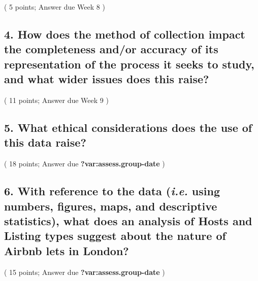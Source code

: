 \documentclass[
  a4paper,
  DIV=11,
  numbers=noendperiod]{scrartcl}
\begin{document}
( 5 points; Answer due Week 8 )

\hypertarget{how-does-the-method-of-collection-impact-the-completeness-andor-accuracy-of-its-representation-of-the-process-it-seeks-to-study-and-what-wider-issues-does-this-raise}{%
\subsection{4. How does the method of collection impact the completeness
and/or accuracy of its representation of the process it seeks to study,
and what wider issues does this
raise?}\label{how-does-the-method-of-collection-impact-the-completeness-andor-accuracy-of-its-representation-of-the-process-it-seeks-to-study-and-what-wider-issues-does-this-raise}}

( 11 points; Answer due Week 9 )

\hypertarget{what-ethical-considerations-does-the-use-of-this-data-raise}{%
\subsection{5. What ethical considerations does the use of this data
raise?}\label{what-ethical-considerations-does-the-use-of-this-data-raise}}

( 18 points; Answer due \textbf{?var:assess.group-date} )

\hypertarget{with-reference-to-the-data-i.e.-using-numbers-figures-maps-and-descriptive-statistics-what-does-an-analysis-of-hosts-and-listing-types-suggest-about-the-nature-of-airbnb-lets-in-london}{%
\subsection{\texorpdfstring{6. With reference to the data (\emph{i.e.}
using numbers, figures, maps, and descriptive statistics), what does an
analysis of Hosts and Listing types suggest about the nature of Airbnb
lets in
London?}{6. With reference to the data (i.e. using numbers, figures, maps, and descriptive statistics), what does an analysis of Hosts and Listing types suggest about the nature of Airbnb lets in London?}}\label{with-reference-to-the-data-i.e.-using-numbers-figures-maps-and-descriptive-statistics-what-does-an-analysis-of-hosts-and-listing-types-suggest-about-the-nature-of-airbnb-lets-in-london}}

( 15 points; Answer due \textbf{?var:assess.group-date} )
\end{document}
